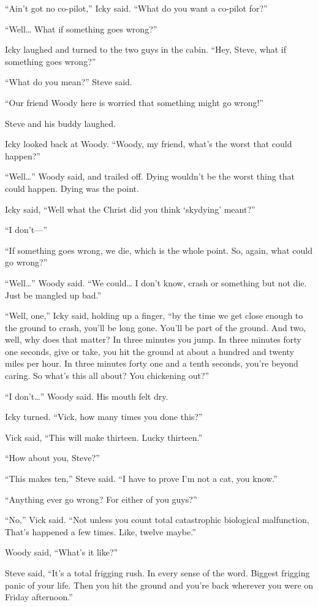 “Ain’t got no co-pilot,” Icky said. “What do you want a co-pilot for?”

“Well… What if something goes wrong?”

Icky laughed and turned to the two guys in the cabin. “Hey, Steve, what if something goes wrong?”

“What do you mean?” Steve said.

“Our friend Woody here is worried that something might go wrong!”

Steve and his buddy laughed.

Icky looked back at Woody. “Woody, my friend, what’s the worst that could happen?”

“Well…” Woody said, and trailed off. Dying wouldn’t be the worst thing that could happen. Dying was the point.

Icky said, “Well what the Christ did you think ‘skydying’ meant?”

“I don’t—”

“If something goes wrong, we die, which is the whole point. So, again, what could go wrong?”

“Well…” Woody said. “We could… I don’t know, crash or something but not die. Just be mangled up bad.”

“Well, one,” Icky said, holding up a finger, “by the time we get close enough to the ground to crash, you’ll be long gone. You’ll be part of the ground. And two, well, why does that matter? In three minutes you jump. In three minutes forty one seconds, give or take, you hit the ground at about a hundred and twenty miles per hour. In three minutes forty one and a tenth seconds, you’re beyond caring. So what’s this all about? You chickening out?”

“I don’t…” Woody said. His mouth felt dry.

Icky turned. “Vick, how many times you done this?”

Vick said, “This will make thirteen. Lucky thirteen.”

“How about you, Steve?”

“This makes ten,” Steve said. “I have to prove I’m not a cat, you know.”

“Anything ever go wrong? For either of you guys?”

“No,” Vick said. “Not unless you count total catastrophic biological malfunction, That’s happened a few times. Like, twelve maybe.”

Woody said, “What’s it like?”

Steve said, “It’s a total frigging rush. In every sense of the word. Biggest frigging panic of your life. Then you hit the ground and you’re back wherever you were on Friday afternoon.”

